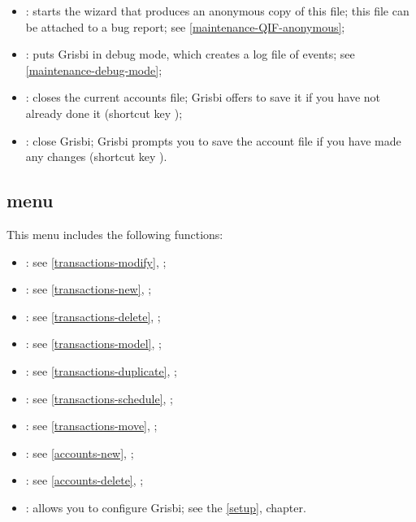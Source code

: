 \begin{itemize}
	\item {}: starts the wizard that produces an anonymous copy of this file; this file can be attached to a bug report; see \vref{maintenance-QIF-anonymous};	
	\item {}: puts Grisbi in debug mode, which creates a log file of events; see \vref{maintenance-debug-mode}; 	
	\item {}: closes the current accounts file; Grisbi offers to save it if you have not already done it (shortcut key );
	\item {}: close Grisbi; Grisbi prompts you to save the account file if you have made any changes (shortcut key ).
\end{itemize}


\subsection{ menu\label{home-menus-edit}}

This menu includes the following functions:

\begin{itemize}
	\item {}: see \vref{transactions-modify}, ;
	\item {}: see \vref{transactions-new}, ;
	\item {}: see \vref{transactions-delete}, ;
	\item {}: see \vref{transactions-model}, ;
	\item {}: see \vref{transactions-duplicate}, ;
	\item {}: see \vref{transactions-schedule}, ;
	\item {}: see \vref{transactions-move}, ;
	\item {}: see \vref{accounts-new}, ;
	\item {}: see \vref{accounts-delete}, ;
	\item {}: allows you to configure Grisbi; see the \vref{setup},  chapter.
\end{itemize}


